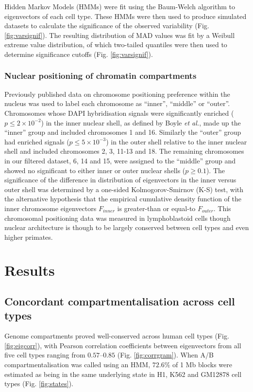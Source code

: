 \documentclass[a4paper]{report}
\begin{document}
Hidden Markov Models (HMMs) were fit using the
Baum-Welch algorithm to eigenvectors of each cell type. These HMMs
were then used to produce simulated datasets to calculate the
significance of the observed variability
(Fig. \ref{fig:varsignif}). The resulting distribution of MAD values
was fit by a Weibull extreme value distribution, of which two-tailed quantiles
were then used to determine significance cutoffs (Fig. \ref{fig:varsignif}).

\subsection{Nuclear positioning of chromatin compartments}
Previously published data  on chromosome positioning preference within
the nucleus was used to label each chromosome as ``inner'', ``middle''
or ``outer''.\cite{Boyle2001} Chromosomes whose DAPI hybridisation
signals were significantly enriched ($p\leq 2\times10^{-2}$) in the inner nuclear shell, as
defined by Boyle \emph{et al.}\cite{Boyle2001}, made up the ``inner''
group and included chromosomes 1 and 16. Similarly the ``outer'' group
had enriched signals ($p\leq 5\times10^{-3}$) in the outer shell relative to the inner nuclear
shell and included chromosomes 2, 3, 11-13 and 18. The remaining
chromosomes in our filtered dataset, 6, 14 and 15, were assigned to
the ``middle'' group and showed no significant to either inner or
outer nuclear shells ($p \geq 0.1$).\cite{Boyle2001} The significance
of the difference in distribution of eigenvectors in the inner
versus outer shell was determined by a one-sided Kolmogorov-Smirnov (K-S)
test, with the alternative hypothesis that the empirical cumulative
density function of the inner chromosome eigenvectors $F_{inner}$
is greater-than or equal-to $F_{outer}$. This chromosomal positioning data was measured in lymphoblastoid
cells though nuclear architecture is though to be largely conserved
between cell types\cite{Chambers2012, DeWit2013} and even higher primates.\cite{Tanabe2002}

\chapter{Results}
\vspace{-24pt}
\section{Concordant compartmentalisation across cell types}\label{res:corr}

Genome compartments proved well-conserved across human cell types
(Fig. \ref{fig:eigcorr}), with Pearson correlation coefficients
between eigenvectors from all five cell
types ranging from $0.57$--$0.85$ (Fig. \ref{fig:corrgram}). When A/B
compartmentalisation was called using an HMM, $72.6\%$ of 1 Mb blocks
were estimated as being in the same underlying state in H1, K562 and
GM12878 cell types (Fig. \ref{fig:states}). \\
\end{document}

